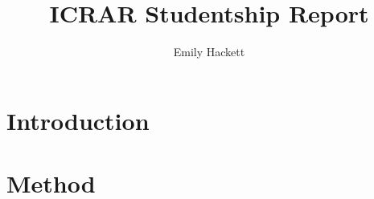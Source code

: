 \documentclass[a4paper]{mnras}
\title[ICRAR Report]{ICRAR Studentship Report}
\author[E. Hackett]{Emily Hackett}
\begin{document}
\label{firstpage}
\maketitle

\begin{abstract}

\end{abstract}

\section{Introduction}


\section{Method}




\end{document}
